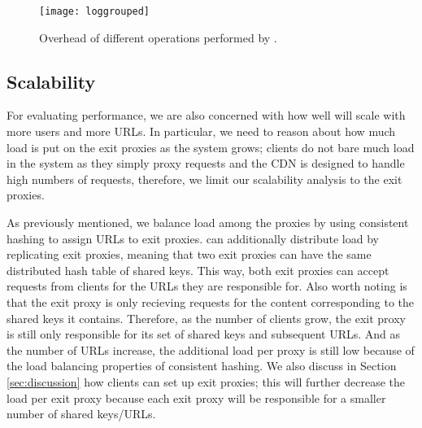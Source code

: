 \begin{figure}[t!]
\centering
\texttt{[image: loggrouped]}
\caption{Overhead of different operations performed by \system{}.}
\label{fig:overhead2}
\end{figure}

\subsection{Scalability}
For evaluating performance, we are also concerned with how well \system{} will scale with more users 
and more URLs.  In particular, we need to reason about how much load is put on the exit proxies as the 
system grows; clients do not bare much load in the system as they simply proxy requests and the CDN is designed 
to handle high numbers of requests, therefore, we limit our scalability analysis to the exit proxies.  

As previously mentioned, we balance load among the proxies by using consistent hashing to assign URLs to 
exit proxies.  \system{} can additionally distribute load by replicating exit proxies, meaning that two exit proxies can 
have the same distributed hash table of shared keys.  This way, both exit proxies can accept requests from clients for 
the URLs they are responsible for.  Also worth noting is that the exit proxy is only recieving requests for the content 
corresponding to the shared keys it contains.  Therefore, as the number of clients grow, the exit proxy is still only responsible 
for its set of shared keys and subsequent URLs.  And as the number of URLs increase, the additional load per proxy is 
still low because of the load balancing properties of consistent hashing.  We also discuss in Section \ref{sec:discussion} how 
clients can set up exit proxies; this will further decrease the load per exit proxy because each exit proxy will be responsible 
for a smaller number of shared keys/URLs.
